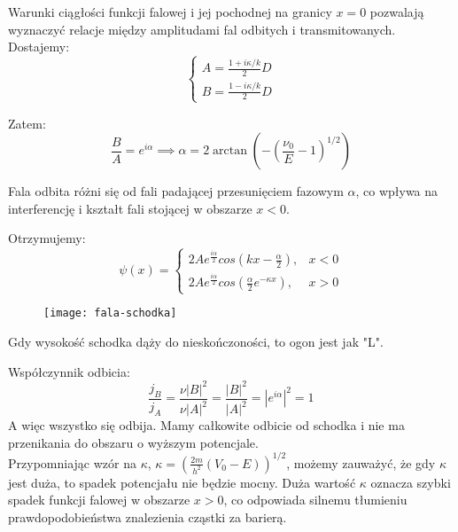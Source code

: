 Warunki ciągłości funkcji falowej i jej pochodnej na granicy $x=0$ pozwalają wyznaczyć relacje między amplitudami fal odbitych i transmitowanych. \\

Dostajemy:
\begin{equation*}
\begin{cases}
    A = \frac{1 + i \kappa / k}{2} D \\
    B = \frac{1 - i \kappa / k}{2} D
\end{cases}
\end{equation*}

Zatem:
\begin{equation*}
\frac{B}{A} = e^{i \alpha} \implies \alpha =2 \arctan \left( - \left(  \frac{\nu_0}{E} - 1 \right) ^{1/2} \right)
\end{equation*}

Fala odbita różni się od fali padającej przesunięciem fazowym $\alpha$, co wpływa na interferencję i kształt fali stojącej w obszarze $x<0$.

Otrzymujemy:
\begin{equation*}
\psi(x) = 
\begin{cases}
    2 A e^{\frac{i \alpha}{2}} cos(kx - \frac{\alpha}{2}), & x < 0 \\
    2 A e^{\frac{i \alpha}{2}} cos(\frac{\alpha}{2} e^{-\kappa x}), & x > 0
\end{cases}
\end{equation*}

\begin{figure}[H]
    \centering
    \texttt{[image: fala-schodka]}
    \label{fig:fala-schodka}
\end{figure}

Gdy wysokość schodka dąży do nieskończoności, to ogon jest jak "L".

Współczynnik odbicia:
\begin{equation*}
\frac{j_B}{j_A} = \frac{\nu \left| B \right|^2}{\nu \left| A \right|^2} = \frac{\left| B \right|^2}{\left| A \right|^2} = \left| e^{i \alpha} \right|^2 = 1
\end{equation*}
A więc wszystko się odbija. Mamy całkowite odbicie od schodka i nie ma przenikania do obszaru o wyższym potencjale. \\

Przypomniając wzór na $\kappa$, $\kappa = \left( \frac{2m}{h^2} (V_0 - E) \right)^{1/2}$, możemy zauważyć, że gdy $\kappa$ jest duża,
to spadek potencjału nie będzie mocny. Duża wartość $\kappa$ oznacza szybki spadek funkcji falowej w obszarze $x>0$,
co odpowiada silnemu tłumieniu prawdopodobieństwa znalezienia cząstki za barierą.


